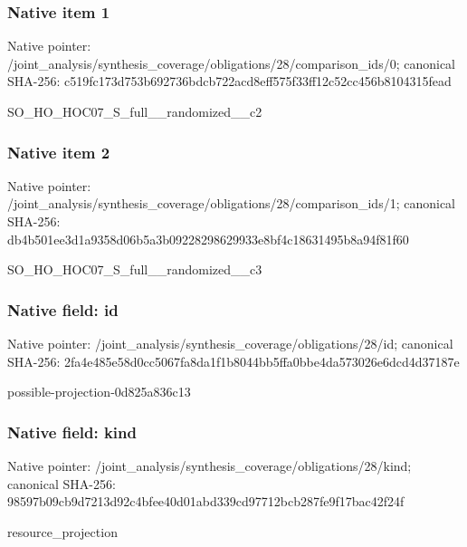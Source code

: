 \documentclass[10pt,a4paper]{article}
\begin{document}
\subsubsection{Native item 1}
Native pointer: /joint\_\allowbreak{}analysis/synthesis\_\allowbreak{}coverage/obligations/28/comparison\_\allowbreak{}ids/0; canonical SHA-256: c519fc173d753b692736bdcb722acd8eff575f33ff12c52cc456b8104315fead

\begingroup\raggedright\sloppy SO\_\allowbreak{}HO\_\allowbreak{}HOC07\_\allowbreak{}S\_\allowbreak{}full\_\allowbreak{}\_\allowbreak{}randomized\_\allowbreak{}\_\allowbreak{}c2\par\endgroup

\subsubsection{Native item 2}
Native pointer: /joint\_\allowbreak{}analysis/synthesis\_\allowbreak{}coverage/obligations/28/comparison\_\allowbreak{}ids/1; canonical SHA-256: db4b501ee3d1a9358d06b5a3b09228298629933e8bf4c18631495b8a94f81f60

\begingroup\raggedright\sloppy SO\_\allowbreak{}HO\_\allowbreak{}HOC07\_\allowbreak{}S\_\allowbreak{}full\_\allowbreak{}\_\allowbreak{}randomized\_\allowbreak{}\_\allowbreak{}c3\par\endgroup

\subsubsection{Native field: id}
Native pointer: /joint\_\allowbreak{}analysis/synthesis\_\allowbreak{}coverage/obligations/28/id; canonical SHA-256: 2fa4e485e58d0cc5067fa8da1f1b8044bb5ffa0bbe4da573026e6dcd4d37187e

\begingroup\raggedright\sloppy possible-projection-0d825a836c13\par\endgroup

\subsubsection{Native field: kind}
Native pointer: /joint\_\allowbreak{}analysis/synthesis\_\allowbreak{}coverage/obligations/28/kind; canonical SHA-256: 98597b09cb9d7213d92c4bfee40d01abd339cd97712bcb287fe9f17bac42f24f

\begingroup\raggedright\sloppy resource\_\allowbreak{}projection\par\endgroup
\end{document}
